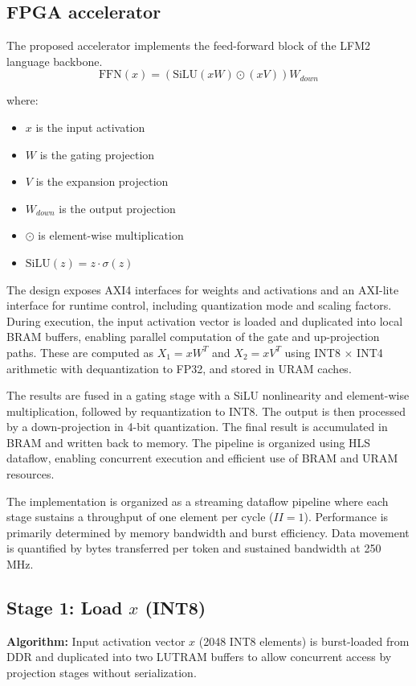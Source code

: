 \documentclass[conference]{IEEEtran}
\begin{document}
\subsection{FPGA accelerator}
The proposed accelerator implements the feed-forward block of the LFM2 language backbone. 
$$ \text{FFN}(x) = (\text{SiLU}(x W) \odot (x V)) W_{down} $$

where:
\begin{itemize}
    \item $x$ is the input activation
    \item $W$ is the gating projection
    \item $V$ is the expansion projection
    \item $W_{down}$ is the output projection
    \item $\odot$ is element-wise multiplication
    \item $\text{SiLU}(z) = z \cdot \sigma(z)$
\end{itemize}
The design exposes AXI4 interfaces for weights and activations and an AXI-lite interface for runtime control, including quantization mode and scaling factors. During execution, the input activation vector is loaded and duplicated into local BRAM buffers, enabling parallel computation of the gate and up-projection paths. These are computed as $X_1 = x W^{T}$ and $X_2 = x V^{T}$ using INT8 $\times$ INT4 arithmetic with dequantization to FP32, and stored in URAM caches.

The results are fused in a gating stage with a SiLU nonlinearity and element-wise multiplication, followed by requantization to INT8. The output is then processed by a down-projection in 4-bit quantization. The final result is accumulated in BRAM and written back to memory. The pipeline is organized using HLS dataflow, enabling concurrent execution and efficient use of BRAM and URAM resources.

The implementation is organized as a streaming dataflow pipeline where each stage sustains a throughput of one element per cycle ($II=1$). Performance is primarily determined by memory bandwidth and burst efficiency. Data movement is quantified by bytes transferred per token and sustained bandwidth at 250 MHz.

\subsection*{Stage 1: Load $x$ (INT8)}
\textbf{Algorithm:} Input activation vector $x$ (2048 INT8 elements) is burst-loaded from DDR and duplicated into two LUTRAM buffers to allow concurrent access by projection stages without serialization.
\end{document}
